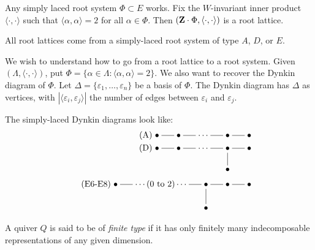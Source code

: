 \documentclass{article}
\begin{document}
\begin{example}
Any simply laced root system $\Phi\subset E$ works. Fix the $W$-invariant 
inner product $\langle\cdot,\cdot\rangle$ such that 
$\langle\alpha,\alpha\rangle = 2$ for all $\alpha\in \Phi$. Then 
$(\mathbf{Z}\cdot \Phi,\langle\cdot,\cdot\rangle)$ is a root lattice. 
\end{example}

\begin{theorem}
All root lattices come from a simply-laced root system of type $A$, $D$, or 
$E$. 
\end{theorem}

We wish to understand how to go from a root lattice to a root system. Given 
$(\Lambda,\langle\cdot,\cdot\rangle)$, put 
$\Phi = \{\alpha\in \Lambda:\langle\alpha,\alpha\rangle = 2\}$. We also want to 
recover the Dynkin diagram of $\Phi$. Let 
$\Delta=\{\varepsilon_1,\dots,\varepsilon_n\}$ be a basis of $\Phi$. The 
Dynkin diagram has $\Delta$ as vertices, with 
$|\langle \varepsilon_i,\varepsilon_j\rangle|$ the number of edges between  
$\varepsilon_i$ and $\varepsilon_j$. 

\begin{example}
The simply-laced Dynkin diagrams look like: 
\begin{align*}\tag{A}
\xymatrix@=0.5cm{
  \bullet \ar@{-}[r] 
    & \bullet \ar@{-}[r] 
    & \cdots \ar@{-}[r] 
    & \bullet \ar@{-}[r] 
    & \bullet 
} \\
\tag{D}
\xymatrix@=0.5cm{
  \bullet \ar@{-}[r] 
    & \bullet \ar@{-}[r] 
    & \cdots \ar@{-}[r] 
    & \bullet \ar@{-}[d] \ar@{-}[r] 
    & \bullet \\
    & & & \bullet
}\\
\tag{E6-E8}
\xymatrix@=0.5cm{
  \bullet \ar@{-}[r] 
    & \cdots (\text{0 to 2})\cdots\ar@{-}[r] 
    & \bullet \ar@{-}[d] \ar@{-}[r] 
    & \bullet \ar@{-}[r] 
    & \bullet \\
    & & \bullet
}
\end{align*}
\end{example}

A quiver $Q$ is said to be of \emph{finite type} if it has only finitely many 
indecomposable representations of any given dimension. 
\end{document}
